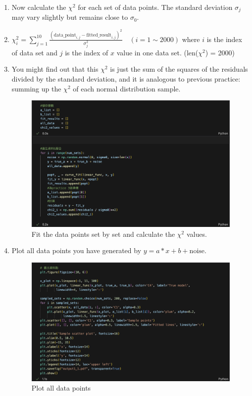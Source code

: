 \documentclass[12pt,a4paper]{article}
\begin{document}
\begin{CJK}{UTF8}{bkai}
\begin{enumerate}
    \item Now calculate the $\chi^2$ for each set of data points. The standard deviation $\sigma_j$ may vary slightly but remains close to $\sigma_0$.
    
    \item $\chi^2_i = \sum_{j=1}^{10} \frac{(\text{data\_point}_{i,j} - \text{fitted\_result}_{i,j})^2}{\sigma_j^2} \quad (i = 1 \sim 2000)$
    where $i$ is the index of data set and $j$ is the index of $x$ value in one data set. (len($\chi^2$) = 2000)
    
    \item You might find out that this $\chi^2$ is just the sum of the squares of the residuals divided by the standard deviation, and it is analogous to previous practice: summing up the $\chi^2$ of each normal distribution sample.

    \begin{figure}[h]
        \centering
        \includegraphics[width=1\linewidth]{figures/code/practice_1/code_1_3.png}
        \caption{Fit the data points set by set and calculate the $\chi^2$ values.}
        \label{fig:code_1_3}
    \end{figure}

    \item Plot all data points you have generated by $y = a \ast x + b + \text{noise}$.
    \begin{figure}[h]
        \centering
        \includegraphics[width=1\linewidth]{figures/code/practice_1/code_1_4.png}
        \caption{Plot all data points}
        \label{fig:code_1_4}
    \end{figure}


\end{enumerate}
\end{CJK}
\end{document}
